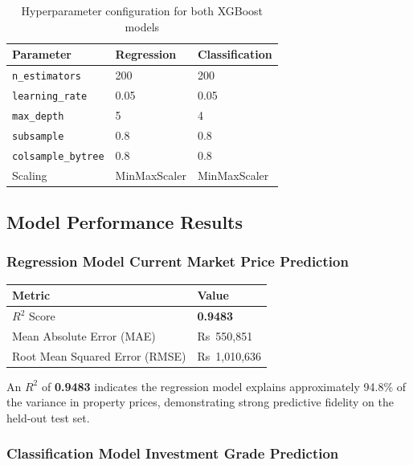 \documentclass[12pt,a4paper]{article}
\begin{document}
\begin{table}[H]
\centering
\caption{Hyperparameter configuration for both XGBoost models}
\renewcommand{\arraystretch}{1.25}
\begin{tabular}{lll}
\toprule
\textbf{Parameter} & \textbf{Regression} & \textbf{Classification} \\
\midrule
\texttt{n\_estimators}     & 200 & 200 \\
\texttt{learning\_rate}    & 0.05 & 0.05 \\
\texttt{max\_depth}        & 5 & 4 \\
\texttt{subsample}         & 0.8 & 0.8 \\
\texttt{colsample\_bytree} & 0.8 & 0.8 \\
Scaling                    & MinMaxScaler & MinMaxScaler \\
\bottomrule
\end{tabular}
\end{table}

\subsection{Model Performance Results}

\subsubsection*{Regression Model \textemdash{} Current Market Price Prediction}

\begin{table}[H]
\centering
\renewcommand{\arraystretch}{1.25}
\begin{tabular}{ll}
\toprule
\textbf{Metric} & \textbf{Value} \\
\midrule
$R^{2}$ Score                  & \textbf{0.9483} \\
Mean Absolute Error (MAE)      & Rs~550,851 \\
Root Mean Squared Error (RMSE) & Rs~1,010,636 \\
\bottomrule
\end{tabular}
\end{table}

An $R^{2}$ of \textbf{0.9483} indicates the regression model explains approximately 94.8\% of the variance in property prices, demonstrating strong predictive fidelity on the held-out test set.

\subsubsection*{Classification Model \textemdash{} Investment Grade Prediction}
\end{document}
